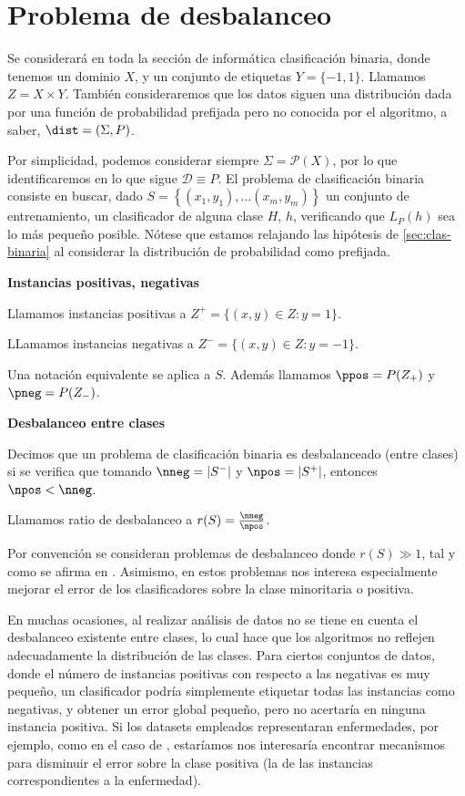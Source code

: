 \section{Problema de desbalanceo}

Se considerará en toda la sección de informática clasificación binaria, donde tenemos un dominio $X$, y un conjunto de etiquetas 
$Y=\{-1,1\}$. Llamamos $Z = X\times Y$. También consideraremos que los datos siguen una distribución dada por una función de 
probabilidad prefijada pero no conocida por el algoritmo, a saber, $\dist=(\Sigma, P)$. 

Por simplicidad, podemos considerar siempre $\Sigma = \mathcal{P}(X)$, por lo que identificaremos en lo que sigue $\mathcal{D} \equiv P$.
El problema de clasificación binaria consiste en buscar, dado $S= \left\{(x_1, y_1), \ldots (x_m, y_m)\right\}$ un 
conjunto de entrenamiento, un clasificador de alguna clase $H$, $h$, verificando que $L_{P}(h)$ sea lo más pequeño posible.
Nótese que estamos relajando las hipótesis de \ref{sec:clas-binaria} al considerar la distribución de probabilidad como prefijada.

\begin{definition} \textbf{Instancias positivas, negativas}

Llamamos instancias positivas a $Z^{+} = \{(x,y)\in Z: y=1\}$.

LLamamos instancias negativas a $Z^{-} = \{(x,y)\in Z: y=-1\}$.

Una notación equivalente se aplica a $S$. Además llamamos $\ppos = P(Z_{+})$ y $\pneg = P(Z_{-})$.
\end{definition}


\begin{definition} \textbf{Desbalanceo entre clases}

 Decimos que un problema de clasificación binaria es desbalanceado (entre clases) si se verifica que tomando 
 $\nneg = |S^{-}|$ y $\npos = |S^{+}|$, entonces $\npos < \nneg$.
 
 Llamamos ratio de desbalanceo a $r(S)=\frac{\nneg}{\npos}$.
\end{definition}

Por convención se consideran problemas de desbalanceo donde $r(S) \gg 1$, tal y como se afirma en \cite{he2009}. Asimismo,
en estos problemas nos interesa especialmente mejorar el error de los clasificadores sobre la clase minoritaria o positiva.

En muchas ocasiones, al realizar análisis de datos no se tiene en cuenta el desbalanceo existente entre clases, lo
cual hace que los algoritmos no reflejen adecuadamente la distribución de las clases. Para ciertos conjuntos de datos,
donde el número de instancias positivas con respecto a las negativas es muy pequeño, un clasificador podría simplemente
etiquetar todas las instancias como negativas, y obtener un error global pequeño, pero no acertaría en ninguna instancia
positiva. Si los datasets empleados representaran enfermedades, por ejemplo, como en el caso de \cite{keelderma}, estaríamos
nos interesaría encontrar mecanismos para disminuir el error sobre la clase positiva (la de las instancias correspondientes
a la enfermedad).

